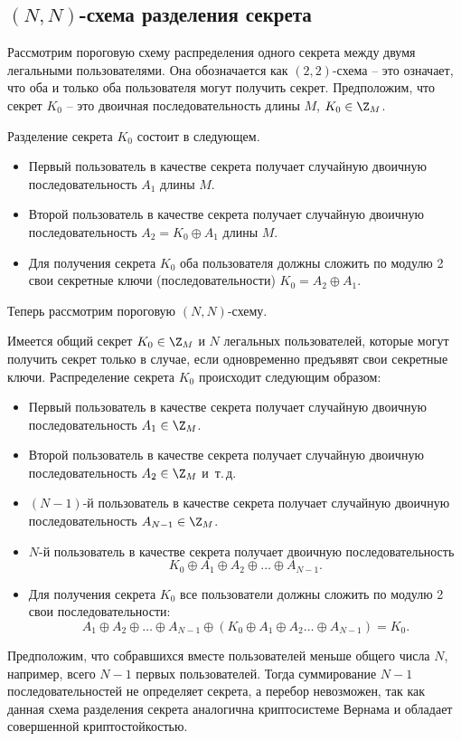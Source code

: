 \subsection[$(N, N)$-схема]{$(N, N)$-схема разделения секрета}

Рассмотрим пороговую схему распределения одного секрета между двумя легальными пользователями. Она обозначается как $(2, 2)$-схема -- это означает, что оба и только оба пользователя могут получить секрет. Предположим, что секрет $K_{0}$ -- это двоичная последовательность длины $M$, $K_{0} \in \Z_{M}$.

Разделение секрета $K_{0}$ состоит в следующем.
\begin{itemize}
    \item Первый пользователь в качестве секрета получает случайную двоичную последовательность $A_{1}$ длины $M$.
    \item Второй пользователь в качестве секрета получает случайную двоичную последовательность $A_{2} =K_{0} \oplus A_{1}$ длины $M$.
    \item Для получения секрета $K_{0}$ оба пользователя должны сложить по модулю 2 свои секретные ключи (последовательности)  $K_{0} = A_{2} \oplus A_{1}$.
\end{itemize}

Теперь рассмотрим пороговую $(N,N)$-схему.

Имеется общий секрет $K_{0} \in \Z_{M}$ и $N$ легальных пользователей, которые могут получить секрет только в случае, если одновременно предъявят свои секретные ключи. Распределение секрета $K_{0}$ происходит следующим образом:

\begin{itemize}
    \item Первый пользователь в качестве секрета получает случайную двоичную последовательность $A_{1} \in \Z_{M}$.
    \item Второй пользователь в качестве секрета получает случайную двоичную последовательность $A_{2} \in \Z_{M}$ и~т.\,д.
    \item $(N-1)$-й пользователь в качестве секрета получает случайную двоичную последовательность $A_{N-1} \in \Z_{M}$.
    \item $N$-й пользователь в качестве секрета получает двоичную последовательность
        \[ K_0 \oplus A_1 \oplus A_2 \oplus \dots \oplus A_{N-1}. \]
    \item Для получения секрета $K_0$ все пользователи должны сложить по модулю 2 свои последовательности:
        \[ A_1 \oplus A_2 \oplus \dots \oplus A_{N-1} \oplus (K_0 \oplus A_1 \oplus A_2 \dots \oplus A_{N-1}) = K_0. \]
\end{itemize}

Предположим, что собравшихся вместе пользователей меньше общего числа $N$, например, всего $N-1$ первых пользователей. Тогда суммирование $N-1$ последовательностей не определяет секрета, а перебор невозможен, так как данная схема разделения секрета аналогична криптосистеме Вернама и обладает совершенной криптостойкостью.
